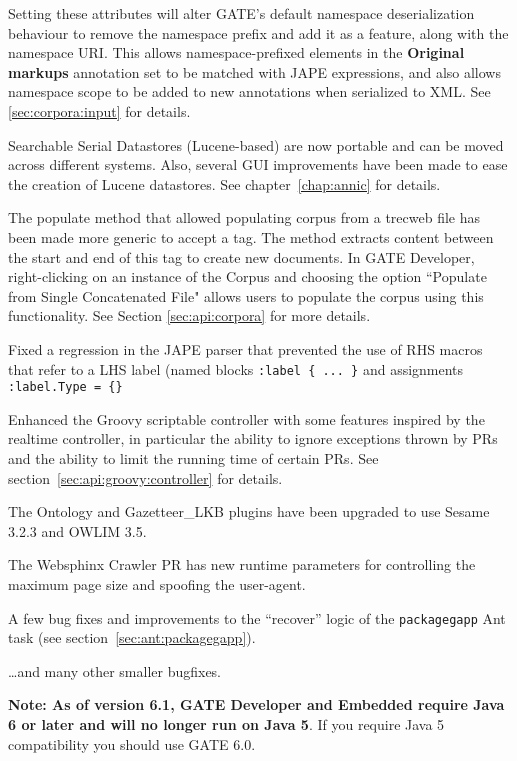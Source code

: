 Setting these attributes will alter GATE's default namespace deserialization
behaviour to remove the namespace prefix and add it as a feature, along with
the namespace URI.  This allows namespace-prefixed elements in the
\textbf{Original markups} annotation set to be matched with JAPE expressions,
and also allows namespace scope to be added to new annotations when serialized
to XML. See  \ref{sec:corpora:input} for details.

Searchable Serial Datastores (Lucene-based) are now portable and can be moved
across different systems. Also, several GUI improvements have been made to ease
the creation of Lucene datastores. See chapter~\ref{chap:annic} for details.

The populate method that allowed populating corpus from a trecweb file has been
made more generic to accept a tag. The method extracts content between the start
and end of this tag to create new documents. In GATE Developer, right-clicking 
on an instance of the Corpus and choosing the option ``Populate from Single
Concatenated File" allows users to populate the corpus using this functionality.
See Section \ref{sec:api:corpora} for more details.

Fixed a regression in the JAPE parser that prevented the use of RHS macros that
refer to a LHS label (named blocks \verb|:label { ... }| and assignments
\verb|:label.Type = {}|

Enhanced the Groovy scriptable controller with some features inspired by the
realtime controller, in particular the ability to ignore exceptions thrown by
PRs and the ability to limit the running time of certain PRs.  See
section~\ref{sec:api:groovy:controller} for details.

The Ontology and Gazetteer\_LKB plugins have been upgraded to use Sesame 3.2.3
and OWLIM 3.5.

The Websphinx Crawler PR has new runtime
parameters for controlling the maximum page size and spoofing the user-agent.

A few bug fixes and improvements to the ``recover'' logic of the
\texttt{packagegapp} Ant task (see section~\ref{sec:ant:packagegapp}).

\ldots and many other smaller bugfixes.

\textbf{Note: As of version 6.1, GATE Developer and Embedded require Java 6 or
later and will no longer run on Java 5}.  If you require Java 5 compatibility
you should use GATE 6.0.

\ifnested\label{subsec:changes:6.0b1}\else\label{sec:changes:6.0b1}\fi

